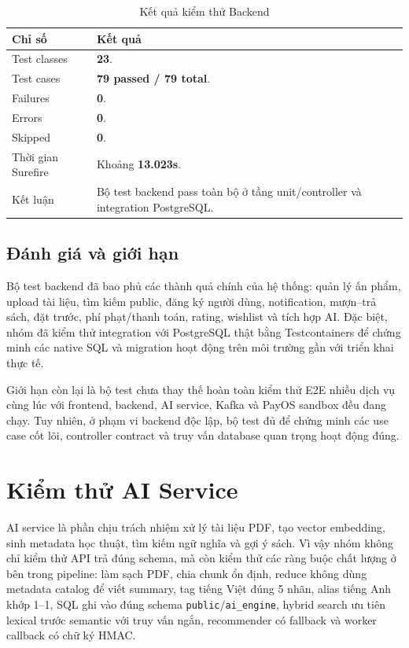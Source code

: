 \begin{table}[H]
\centering
\small
\begin{tabularx}{\textwidth}{|p{4cm}|X|}
\hline
\textbf{Chỉ số} & \textbf{Kết quả} \\
\hline
Test classes & \textbf{23}. \\
\hline
Test cases & \textbf{79 passed / 79 total}. \\
\hline
Failures & \textbf{0}. \\
\hline
Errors & \textbf{0}. \\
\hline
Skipped & \textbf{0}. \\
\hline
Thời gian Surefire & Khoảng \textbf{13.023s}. \\
\hline
Kết luận & Bộ test backend pass toàn bộ ở tầng unit/controller và integration PostgreSQL. \\
\hline
\end{tabularx}
\caption{Kết quả kiểm thử Backend}
\label{tab:be_test_result}
\end{table}

\subsection{Đánh giá và giới hạn}

Bộ test backend đã bao phủ các thành quả chính của hệ thống: quản lý
ấn phẩm, upload tài liệu, tìm kiếm public, đăng ký người dùng, notification,
mượn--trả sách, đặt trước, phí phạt/thanh toán, rating, wishlist và tích hợp AI. Đặc biệt, nhóm đã
kiểm thử integration với PostgreSQL thật bằng Testcontainers để chứng minh các
native SQL và migration hoạt động trên môi trường gần với triển khai thực tế.

Giới hạn còn lại là bộ test chưa thay thế hoàn toàn kiểm thử E2E nhiều dịch vụ
cùng lúc với frontend, backend, AI service, Kafka và PayOS sandbox đều đang
chạy. Tuy nhiên, ở phạm vi backend độc lập, bộ test đủ để chứng minh
các use case cốt lõi, controller contract và truy vấn database quan trọng hoạt
động đúng.

\section{Kiểm thử AI Service}

AI service là phần chịu trách nhiệm xử lý tài liệu PDF, tạo vector embedding,
sinh metadata học thuật, tìm kiếm ngữ nghĩa và gợi ý sách. Vì vậy nhóm không chỉ
kiểm thử API trả đúng schema, mà còn kiểm thử các ràng buộc chất lượng ở bên
trong pipeline: làm sạch PDF, chia chunk ổn định, reduce không dùng metadata
catalog để viết summary, tag tiếng Việt đúng 5 nhãn, alias tiếng Anh khớp
1--1, SQL ghi vào đúng schema \texttt{public}/\texttt{ai\_engine}, hybrid search
ưu tiên lexical trước semantic với truy vấn ngắn, recommender có fallback và
worker callback có chữ ký HMAC.


